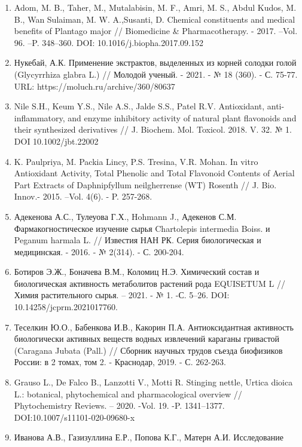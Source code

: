\begin{references}
\begin{enumerate}
\def\labelenumi{\arabic{enumi}.}
\item
  Adom, M. B., Taher, M., Mutalabisin, M. F., Amri, M. S., Abdul Kudos,
  M. B., Wan Sulaiman, M. W. A.,Susanti, D. Chemical constituents and
  medical benefits of Plantago major // Biomedicine \& Pharmacotherapy.
  - 2017. --Vol. 96. --P. 348--360. DOI: 10.1016/j.biopha.2017.09.152
\item
  Нукебай, А.К. Применение экстрактов, выделенных из корней солодки
  голой (Glycyrrhiza glabra L.) // Молодой ученый. - 2021. - № 18 (360).
  - С. 75-77. URL: https://moluch.ru/archive/360/80637
\item
  Nile S.H., Keum Y.S., Nile A.S., Jalde S.S., Patel R.V. Antioxidant,
  anti-inflammatory, and enzyme inhibitory activity of natural plant
  flavonoids and their synthesized derivatives // J. Biochem. Mol.
  Toxicol. 2018. V. 32. № 1. DOI 10.1002/jbt.22002
\item
  K. Paulpriya, M. Packia Lincy, P.S. Tresina, V.R. Mohan. In vitro
  Antioxidant Activity, Total Phenolic and Total Flavonoid Contents of
  Aerial Part Extracts of Daphnipfyllum neilgherrense (WT) Rosenth // J.
  Bio. Innov.- 2015. --Vol. 4(6). - P. 257-268.
\item
  Адекенова А.С., Тулеуова Г.Х., Hohmann J., Адекенов С.М.
  Фармакогностическое изучение сырья Chartolepis intermedia Boiss. и
  Peganum harmala L. // Известия НАН РК. Серия биологическая и
  медицинская. - 2016. - № 2(314). - С. 200-204.
\item
  Ботиров Э.Ж., Боначева В.М., Коломиц Н.Э. Химический состав и
  биологическая активность метаболитов растений рода EQUISETUM L //
  Химия растительного сырья. -- 2021. - № 1. -С. 5--26. DOI:
  10.14258/jcprm.2021017760.
\item
  Теселкин Ю.О., Бабенкова И.В., Какорин П.А. Антиоксидантная активность
  биологически активных веществ водных извлечений караганы гривастой
  (Caragana Jubata (Pall.) // Сборник научных трудов съезда биофизиков
  России: в 2 томах, том 2. - Краснодар, 2019. - С. 262-263.
\item
  Grauso L., De Falco B., Lanzotti V., Motti R. Stinging nettle, Urtica
  dioica L.: botanical, phytochemical and pharmacological overview //
  Phytochemistry Reviews. -- 2020. -Vol. 19. -P. 1341--1377.
  DOI:10.1007/s11101-020-09680-x
\item
  Иванова А.В., Газизуллина Е.Р., Попова К.Г., Матерн А.И. Исследование

\end{enumerate}
\end{references}
